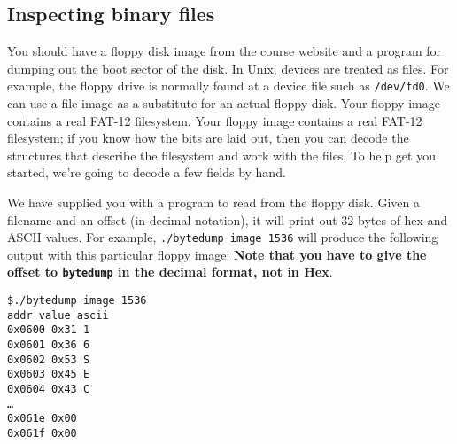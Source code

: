 \documentclass[letterpaper,10pt]{article}
\begin{document}
%


\subsection{Inspecting binary files}
You should have a floppy disk image from the course website and a program for dumping out
the boot sector of the disk. In Unix, devices are treated as files. For example,
the floppy drive is normally found at a device file such as \verb=/dev/fd0=.
We can use a file image as a substitute for an actual floppy disk. Your floppy image contains a real
FAT-12 filesystem. Your floppy image contains a real
FAT-12 filesystem; if you know how the bits are laid
out, then you can decode the structures that describe the filesystem and work with the
files. To help get you started, we're going to decode a few fields by hand.

We have supplied you with a program to read from the floppy disk. Given a filename and an
offset (in decimal notation), it will print out 32 bytes of hex and ASCII values. For example,
\verb+./bytedump image 1536+ will produce the following output with this particular floppy image:
{\bf Note that you have to give the offset to \verb+bytedump+ in the decimal format, not in Hex}.
\begin{verbatim}
$./bytedump image 1536
addr value ascii
0x0600 0x31 1
0x0601 0x36 6
0x0602 0x53 S
0x0603 0x45 E
0x0604 0x43 C
…
0x061e 0x00
0x061f 0x00
\end{verbatim}
\end{document}
